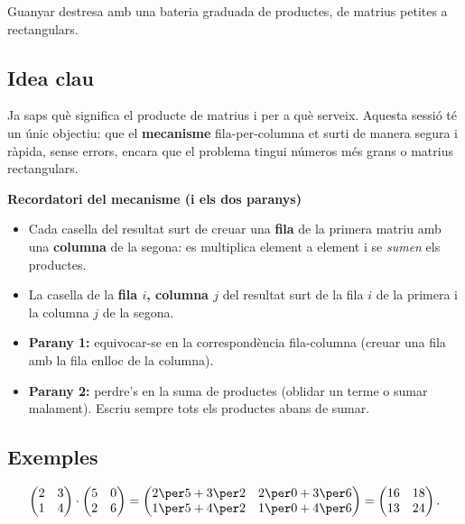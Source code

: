 %
{Guanyar destresa amb una bateria graduada de productes, de matrius petites a rectangulars.}

\subsection{Idea clau}

Ja saps què significa el producte de matrius i per a què serveix. Aquesta sessió
té un únic objectiu: que el \textbf{mecanisme} fila-per-columna et surti de manera
segura i ràpida, sense errors, encara que el problema tingui números més grans o
matrius rectangulars.

\begin{idea}
\textbf{Recordatori del mecanisme (i els dos paranys)}
\begin{itemize}[leftmargin=1.4em, itemsep=2pt]
  \item Cada casella del resultat surt de creuar una \textbf{fila} de la primera
        matriu amb una \textbf{columna} de la segona: es multiplica element a
        element i se \emph{sumen} els productes.
  \item La casella de la \textbf{fila $i$, columna $j$} del resultat surt de la
        fila $i$ de la primera i la columna $j$ de la segona.
  \item \textbf{Parany 1:} equivocar-se en la correspondència fila-columna (creuar
        una fila amb la fila enlloc de la columna).
  \item \textbf{Parany 2:} perdre's en la suma de productes (oblidar un terme o
        sumar malament). Escriu sempre tots els productes abans de sumar.
\end{itemize}
\end{idea}

\subsection{Exemples}

\begin{exemple}
\[
\begin{pmatrix} 2 & 3 \\ 1 & 4 \end{pmatrix}\cdot\begin{pmatrix} 5 & 0 \\ 2 & 6 \end{pmatrix}
=\begin{pmatrix} 2\per 5+3\per 2 & 2\per 0+3\per 6 \\ 1\per 5+4\per 2 & 1\per 0+4\per 6 \end{pmatrix}
=\begin{pmatrix} 16 & 18 \\ 13 & 24 \end{pmatrix}.
\]
\end{exemple}

